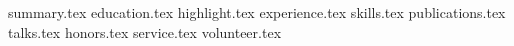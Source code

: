 \documentclass[11pt, a4paper]{awesome-cv}
\newcommand*{\sectiondir}{resume/}
\begin{document}
\makecvheader

{summary.tex}
{education.tex}
{highlight.tex}
{experience.tex}
{skills.tex}
{publications.tex}
{talks.tex}
{honors.tex}
{service.tex}
{volunteer.tex}
\end{document}

